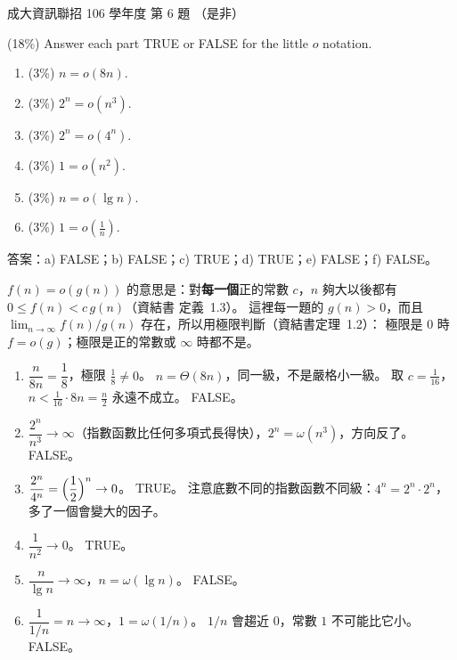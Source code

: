 \begin{pastexam}[label={px:ncku-106-prog-06}]{成大資訊聯招 106 學年度 第 6 題}
（是非）

(18\%) Answer each part TRUE or FALSE for the little $o$ notation.
\begin{enumerate}[label=\alph*)]
\item (3\%) $n=o(8n)$.
\item (3\%) $2^n=o(n^3)$.
\item (3\%) $2^n=o(4^n)$.
\item (3\%) $1=o(n^2)$.
\item (3\%) $n=o(\lg n)$.
\item (3\%) $1=o(\frac{1}{n})$.
\end{enumerate}
\end{pastexam}

\begin{pastsoln}
答案：a) FALSE；b) FALSE；c) TRUE；d) TRUE；e) FALSE；f) FALSE。

$f(n) = o(g(n))$ 的意思是：對\textbf{每一個}正的常數 $c$，$n$ 夠大以後都有 $0 \le f(n) < c\,g(n)$（資結書
定義~1.3）。 這裡每一題的 $g(n) > 0$，而且 $\lim_{n\to\infty} f(n)/g(n)$ 存在，所以用極限判斷（資結書定理~1.2）：
極限是 $0$ 時 $f = o(g)$；極限是正的常數或 $\infty$ 時都不是。

\begin{enumerate}[label=\alph*)]
\item $\dfrac{n}{8n} = \dfrac{1}{8}$，極限 $\frac{1}{8} \ne 0$。 $n = \Theta(8n)$，同一級，不是嚴格小一級。 取
$c = \frac{1}{16}$，$n < \frac{1}{16} \cdot 8n = \frac{n}{2}$ 永遠不成立。 FALSE。
\item $\dfrac{2^n}{n^3} \to \infty$（指數函數比任何多項式長得快），$2^n = \omega(n^3)$，方向反了。 FALSE。
\item $\dfrac{2^n}{4^n} = \Bigl(\dfrac{1}{2}\Bigr)^n \to 0$。 TRUE。 注意底數不同的指數函數不同級：$4^n = 2^n \cdot 2^n$，
多了一個會變大的因子。
\item $\dfrac{1}{n^2} \to 0$。 TRUE。
\item $\dfrac{n}{\lg n} \to \infty$，$n = \omega(\lg n)$。 FALSE。
\item $\dfrac{1}{1/n} = n \to \infty$，$1 = \omega(1/n)$。 $1/n$ 會趨近 $0$，常數 $1$ 不可能比它小。 FALSE。
\end{enumerate}
\end{pastsoln}

